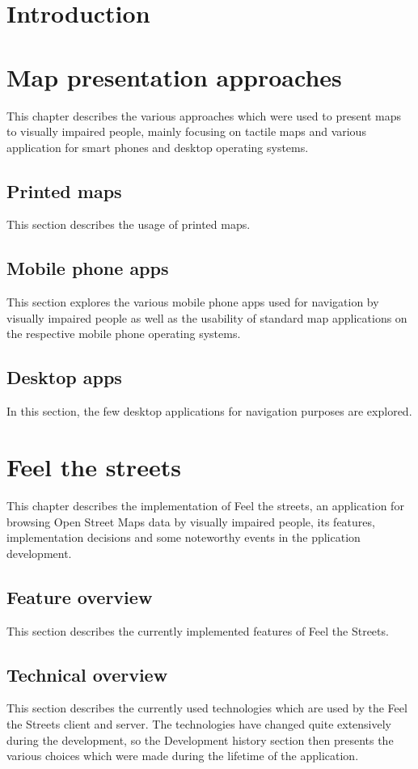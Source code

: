 \documentclass[nolof,digital]{fithesis3}
\begin{document}
\chapter{Introduction}
\chapter{Map presentation approaches}
This chapter describes the various approaches which were used to present maps to visually impaired people, mainly focusing on tactile maps and various application for smart phones and desktop operating systems.
\section{Printed maps}
This section describes the usage of printed maps.
\section{Mobile phone apps}
This section explores the various mobile phone apps used for navigation by visually impaired people as well as the usability of standard map applications on the respective mobile phone operating systems.
\section{Desktop apps}
In this section, the few desktop applications for navigation purposes are explored.
\chapter{Feel the streets}
This chapter describes the implementation of Feel the streets, an application for browsing Open Street Maps data by visually impaired people, its features, implementation decisions and some noteworthy events in the pplication development.
\section{Feature overview}
This section describes the currently implemented features of Feel the Streets.
\section{Technical overview}
This section describes the currently used technologies which are used by the Feel the Streets client and server. The technologies have changed quite extensively during the development, so the Development history section then presents the various choices which were made during the lifetime of the application.
\end{document}
